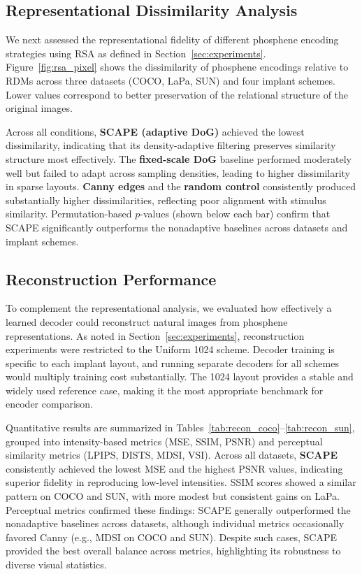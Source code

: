 \subsection{Representational Dissimilarity Analysis}
We next assessed the representational fidelity of different phosphene encoding strategies using RSA as defined in Section~\ref{sec:experiments}. 
Figure~\ref{fig:rsa_pixel} shows the dissimilarity of phosphene encodings relative to RDMs across three datasets (COCO, LaPa, SUN) and four implant schemes. 
Lower values correspond to better preservation of the relational structure of the original images.

Across all conditions, \textbf{SCAPE (adaptive DoG)} achieved the lowest dissimilarity, indicating that its density-adaptive filtering preserves similarity structure most effectively. 
The \textbf{fixed-scale DoG} baseline performed moderately well but failed to adapt across sampling densities, leading to higher dissimilarity in sparse layouts. 
\textbf{Canny edges} and the \textbf{random control} consistently produced substantially higher dissimilarities, reflecting poor alignment with stimulus similarity. 
Permutation-based $p$-values (shown below each bar) confirm that SCAPE significantly outperforms the nonadaptive baselines across datasets and implant schemes.


\subsection{Reconstruction Performance}
To complement the representational analysis, we evaluated how effectively a learned decoder could reconstruct natural images from phosphene representations. 
As noted in Section~\ref{sec:experiments}, reconstruction experiments were restricted to the Uniform 1024 scheme. 
Decoder training is specific to each implant layout, and running separate decoders for all schemes would multiply training cost substantially. 
The 1024 layout provides a stable and widely used reference case, making it the most appropriate benchmark for encoder comparison.

Quantitative results are summarized in Tables~\ref{tab:recon_coco}--\ref{tab:recon_sun}, grouped into intensity-based metrics (MSE, SSIM, PSNR) and perceptual similarity metrics (LPIPS, DISTS, MDSI, VSI).
Across all datasets, \textbf{SCAPE} consistently achieved the lowest MSE and the highest PSNR values, indicating superior fidelity in reproducing low-level intensities. 
SSIM scores showed a similar pattern on COCO and SUN, with more modest but consistent gains on LaPa. 
Perceptual metrics confirmed these findings: SCAPE generally outperformed the nonadaptive baselines across datasets, although individual metrics occasionally favored Canny (e.g., MDSI on COCO and SUN). 
Despite such cases, SCAPE provided the best overall balance across metrics, highlighting its robustness to diverse visual statistics.

